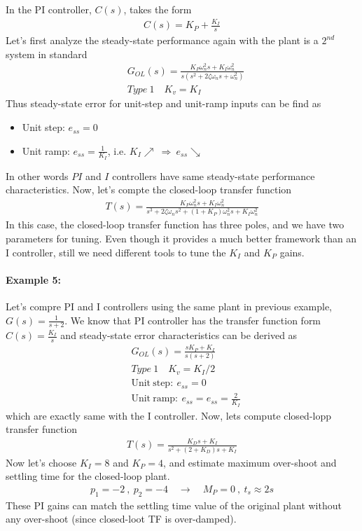 \documentclass[twoside]{article}
\begin{document}
In the PI controller, $C(s)$, takes the form
%
\begin{align*}
 C(s) = K_P + \frac{K_I}{s}
\end{align*}
%
Let's first analyze the steady-state 
performance again with the plant is a $2^{nd}$ system in standard
%
\begin{align*}
  &G_{OL}(s) = \frac{K_P \omega_n^2 s +  K_I \omega_n^2}{s (s^2 + 2 \zeta
    \omega_n s + \omega_n^2)}
\\
 &Type \ 1 \quad K_v = K_I
\end{align*}
% 
Thus steady-state error for unit-step and unit-ramp inputs can be find
as
\begin{itemize}
\item Unit step: $e_{ss} = 0$ 
\item Unit ramp: $e_{ss} = \frac{1}{K_I}$, i.e. $K_I \nearrow \ \Rightarrow \ e_{ss} \searrow$  
\end{itemize}
In other words $PI$ and $I$ controllers have same steady-state
performance characteristics. Now, let's compte the closed-loop transfer function
%
\begin{align*}
T(s) = \frac{K_P \omega_n^2 s + K_I \omega_n^2}{s^3 + 2 \zeta \omega_n
  s^2 + (1 + K_P) \omega_n^2 s
  + K_I \omega_n^2}
\end{align*}
In this case, the closed-loop transfer function has three poles, 
and we have two parameters for tuning. Even though it provides a
much better framework than an I controller, still we need different tools
to tune the $K_I$ and $K_P$ gains.

\paragraph{Example 5:} Let's compre PI and I controllers using the
same plant in previous example, $G(s) = \frac{1}{s+2}$. We know that
PI controller has the transfer function form $C(s) = \frac{K_I}{s}$
and steady-state error characteristics can be derived as
%
\begin{align*}
  &G_{OL}(s) = \frac{s K_P + K_I }{s (s + 2)}
\\
 &Type \ 1 \quad K_v = K_I / 2
\\
&\mathrm{Unit} \ \mathrm{step :} \ e_{ss} = 0
\\
&\mathrm{Unit} \ \mathrm{ramp :} \ e_{ss} = e_{ss} = \frac{2}{K_I}
\end{align*}
% 
which are exactly same with the I controller. Now, lets
compute closed-lopp transfer function
%
\begin{align*}
  T(s) = \frac{K_D s + K_I}{s^2 + (2+K_D) s + K_I}
\end{align*}
%
Now let's choose $K_I = 8$ and $K_P = 4$, and estimate maximum
over-shoot and settling time for the closed-loop plant. 
%
\begin{align*}
p_{1} = -2 \ , \ p_{2} = -4
\quad \rightarrow \quad M_P = 0 \ , \ t_{s} \approx 2 s
\end{align*}
% 
These PI gains can match the settling time value
of the original plant without any over-shoot (since closed-loot
TF is over-damped).
\end{document}
